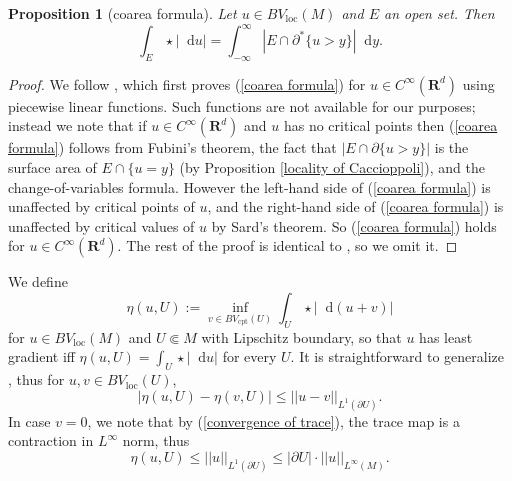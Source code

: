 \documentclass[reqno,10pt]{amsart}
\newcommand{\RR}{\mathbf{R}}
\DeclareMathOperator{\supp}{supp}
\newcommand*\dif{\mathop{}\!\mathrm{d}}
\newcommand{\loc}{\mathrm{loc}}
\newcommand{\cpt}{\mathrm{cpt}}
\newtheorem{proposition}[theorem]{Proposition}
\theoremstyle{definition}
\numberwithin{equation}{section}
\begin{document}
\begin{proposition}[coarea formula]\label{Coarea2}
Let $u \in BV_\loc(M)$ and $E$ an open set. Then
\begin{equation}\label{coarea formula}
\int_E \star |\dif u| = \int_{-\infty}^\infty |E \cap \partial^* \{u > y\}| \dif y.
\end{equation}
\end{proposition}
\begin{proof}
We follow \cite[Theorem 1.23]{Giusti77}, which first proves (\ref{coarea formula}) for $u \in C^\infty(\RR^d)$ using piecewise linear functions.
Such functions are not available for our purposes; instead we note that if $u \in C^\infty(\RR^d)$ and $u$ has no critical points then (\ref{coarea formula}) follows from Fubini's theorem, the fact that $|E \cap \partial \{u > y\}|$ is the surface area of $E \cap \{u = y\}$ (by Proposition \ref{locality of Caccioppoli}), and the change-of-variables formula.
However the left-hand side of (\ref{coarea formula}) is unaffected by critical points of $u$, and the right-hand side of (\ref{coarea formula}) is unaffected by critical values of $u$ by Sard's theorem.
So (\ref{coarea formula}) holds for $u \in C^\infty(\RR^d)$.
The rest of the proof is identical to \cite[Theorem 1.23]{Giusti77}, so we omit it.
\end{proof}

We define
$$\eta(u, U) := \inf_{v \in BV_\cpt(U)} \int_U \star |\dif(u + v)|$$
for $u \in BV_\loc(M)$ and $U \Subset M$ with Lipschitz boundary, so that $u$ has least gradient iff $\eta(u, U) = \int_U \star |\dif u|$ for every $U$.
It is straightforward to generalize \cite[Lemma 5.6]{Giusti77}, thus for $u, v \in BV_\loc(U)$,
\begin{equation}
|\eta(u, U) - \eta(v, U)| \leq ||u - v||_{L^1(\partial U)}. \label{a priori estimate 1}
\end{equation}
In case $v = 0$, we note that by (\ref{convergence of trace}), the trace map is a contraction in $L^\infty$ norm, thus
\begin{equation}
\eta(u, U) \leq ||u||_{L^1(\partial U)} \leq |\partial U| \cdot ||u||_{L^\infty(M)}. \label{a priori estimate 2}
\end{equation}
\end{document}
